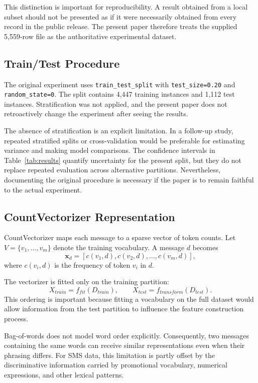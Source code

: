 \documentclass[conference]{IEEEtran}
\begin{document}
This distinction is important for reproducibility. A result obtained from a local subset should not be presented as if it were necessarily obtained from every record in the public release. The present paper therefore treats the supplied 5,559-row file as the authoritative experimental dataset.



\subsection{Train/Test Procedure}
The original experiment uses \texttt{train\_test\_split} with \texttt{test\_size=0.20} and \texttt{random\_state=0}. The split contains 4,447 training instances and 1,112 test instances. Stratification was not applied, and the present paper does not retroactively change the experiment after seeing the results.

The absence of stratification is an explicit limitation. In a follow-up study, repeated stratified splits or cross-validation would be preferable for estimating variance and making model comparisons. The confidence intervals in Table~\ref{tab:results} quantify uncertainty for the present split, but they do not replace repeated evaluation across alternative partitions. Nevertheless, documenting the original procedure is necessary if the paper is to remain faithful to the actual experiment.

\subsection{CountVectorizer Representation}
CountVectorizer maps each message to a sparse vector of token counts. Let $V=\{v_1,\dots,v_m\}$ denote the training vocabulary. A message $d$ becomes
\begin{equation}
\mathbf{x}_d=[c(v_1,d),c(v_2,d),\ldots,c(v_m,d)],
\end{equation}
where $c(v_i,d)$ is the frequency of token $v_i$ in $d$.

The vectorizer is fitted only on the training partition:
\begin{equation}
X_{train}=f_{fit}(D_{train}), \qquad X_{test}=f_{transform}(D_{test}).
\end{equation}
This ordering is important because fitting a vocabulary on the full dataset would allow information from the test partition to influence the feature construction process.

Bag-of-words does not model word order explicitly. Consequently, two messages containing the same words can receive similar representations even when their phrasing differs. For SMS data, this limitation is partly offset by the discriminative information carried by promotional vocabulary, numerical expressions, and other lexical patterns.
\end{document}
